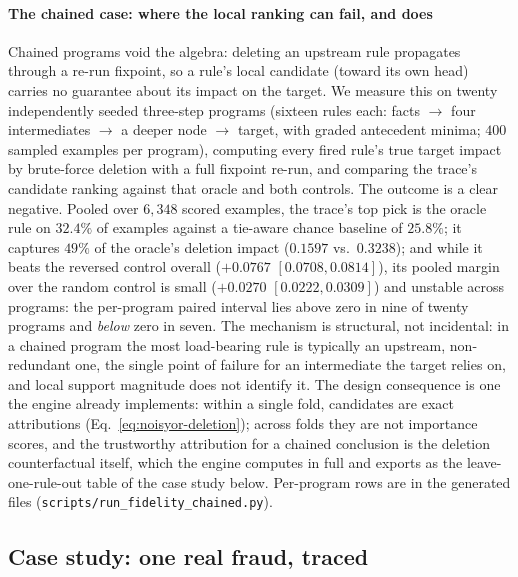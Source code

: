\paragraph{The chained case: where the local ranking can fail, and does}
Chained programs void the algebra: deleting an upstream rule
propagates through a re-run fixpoint, so a rule's local candidate
(toward its own head) carries no guarantee about its impact on the
target. We measure this on twenty independently seeded
three-step programs (sixteen rules each: facts $\to$ four
intermediates $\to$ a deeper node $\to$ target, with graded antecedent
minima; $400$ sampled examples per program), computing every fired
rule's true target impact by brute-force deletion with a full fixpoint
re-run, and comparing the trace's candidate ranking against that
oracle and both controls. The outcome is a clear negative. Pooled
over $6{,}348$ scored examples, the trace's top pick is the oracle
rule on $32.4\%$ of examples against a tie-aware chance baseline of
$25.8\%$; it captures $49\%$ of the oracle's deletion impact ($0.1597$
vs.\ $0.3238$); and while it beats the reversed control overall
($+0.0767$ $[0.0708, 0.0814]$), its pooled margin over the random
control is small ($+0.0270$ $[0.0222, 0.0309]$) and unstable across
programs: the per-program paired interval lies above zero in nine of
twenty programs and \emph{below} zero in seven. The mechanism is
structural, not incidental: in a chained program the most load-bearing
rule is typically an upstream, non-redundant one, the single point
of failure for an intermediate the target relies on, and local
support magnitude does not identify it. The design consequence is one
the engine already implements: within a single fold, candidates are
exact attributions (Eq.~\ref{eq:noisyor-deletion}); across folds they
are not importance scores, and the trustworthy attribution for a
chained conclusion is the deletion counterfactual itself, which the
engine computes in full and exports as the leave-one-rule-out table of
the case study below. Per-program rows are in the generated files
(\texttt{scripts/run\_fidelity\_chained.py}).

\subsection{Case study: one real fraud, traced}\label{sec:casestudy}

